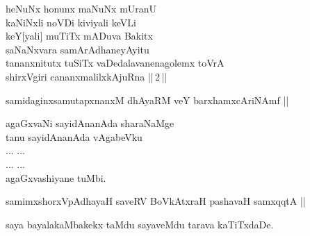 \begin{entry}
\begin{shl}
heNuNx honunx maNuNx mUranU\\
kaNiNxli noVDi kiviyali keVLi\\
keY[yali] muTiTx mADuva Bakitx\\
saNaNxvara samArAdhaneyAyitu\\
tananxnitutx tuSiTx vaDedalavanenagolemx toVrA\\
shirxVgiri cananxmalilxkAjuRna ||\,2\,||
\end{shl}
\end{entry}

\begin{entry}
\begin{shl}
samidaginxsamutapxnanxM dhAyaRM veY barxhamxcAriNAmf ||
\end{shl}
\end{entry}

\begin{entry}
\gl{}
\begin{shl}
agaGxvaNi sayidAnanAda sharaNaMge\\
tanu sayidAnanAda vAgabeVku\\
... ...\\
... ...\\
agaGxvashiyane tuMbi.
\end{shl}
\end{entry}

\begin{entry}
\begin{shl}
samimxshorxVpAdhayaH saveRV BoVkAtxraH pashavaH samxqqtA ||
\end{shl}
\end{entry}

\begin{entry}
\gl{}
\begin{shl}
saya bayalakaMbakekx taMdu sayaveMdu tarava kaTiTxdaDe.
\end{shl}
\end{entry}

